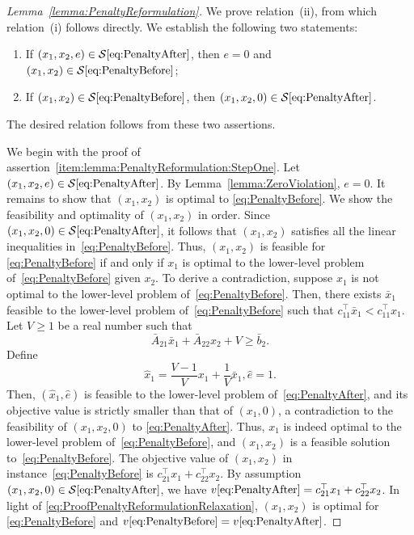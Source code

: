 \documentclass[runningheads,orivec]{llncs}
\newcommand{\MacroColor}[1]{#1}
\newcommand{\OptValFunc}{\MacroColor{v}}
\newcommand{\OptSolSet}{\MacroColor{\mathcal{S}}}
\newcommand{\ReformPen}{\MacroColor{e}}
\begin{document}
\begin{appendix}
\begin{proof}[Lemma~\ref{lemma:PenaltyReformulation}]
We prove relation~(ii), from which relation~(i) follows directly.
We establish the following two statements: 
\begin{enumerate}[label=(A-\arabic*)]
\item
\label{item:lemma:PenaltyReformulation:StepOne}
If $(x_1, x_2, \ReformPen) \in \OptSolSet\eqref{eq:PenaltyAfter}$, then $\ReformPen = 0$ and $(x_1, x_2) \in \OptSolSet\eqref{eq:PenaltyBefore}$;
\item 
\label{item:lemma:PenaltyReformulation:StepTwo}
If $(x_1, x_2) \in \OptSolSet\eqref{eq:PenaltyBefore}$, then $(x_1, x_2, 0) \in \OptSolSet\eqref{eq:PenaltyAfter}$.
\end{enumerate}
The desired relation follows from these two assertions.

We begin with the proof of assertion~\ref{item:lemma:PenaltyReformulation:StepOne}.
Let $(x_1, x_2, \ReformPen) \in \OptSolSet\eqref{eq:PenaltyAfter}$.
By Lemma~\ref{lemma:ZeroViolation}, $\ReformPen = 0$.
It remains to show that $(x_1, x_2)$ is optimal to \eqref{eq:PenaltyBefore}. 
We show the feasibility and optimality of $(x_1, x_2)$ in order.
Since $(x_1, x_2, 0) \in \OptSolSet\eqref{eq:PenaltyAfter}$, it follows that $(x_1, x_2)$ satisfies all the linear inequalities in~\eqref{eq:PenaltyBefore}.
Thus, $(x_1, x_2)$ is feasible for \eqref{eq:PenaltyBefore} if and only if $x_1$ is optimal to the lower-level problem of~\eqref{eq:PenaltyBefore} given $x_2$.
To derive a contradiction, suppose $x_1$ is not optimal to the lower-level problem of~\eqref{eq:PenaltyBefore}.
Then, there exists $\bar{x}_1$ feasible to the lower-level problem of~\eqref{eq:PenaltyBefore} such that $c_{1 1}^{\top} \bar{x}_1 < c_{1 1}^{\top} x_1$.
Let $V \ge 1$ be a real number such that
$$
\bar{A}_{2 1} \bar{x}_1 + \bar{A}_{2 2} x_2 + V \ge \bar{b}_2.
$$
Define
$$
\hat{x}_1 = \frac{V - 1}{V} x_1 + \frac{1}{V} \bar{x}_1, \hat{e} = 1.
$$
Then, $(\hat{x}_1, \hat{e})$ is feasible to the lower-level problem of~\eqref{eq:PenaltyAfter}, and its objective value is strictly smaller than that of $(x_1, 0)$, a contradiction to the feasibility of $(x_1, x_2, 0)$ to \eqref{eq:PenaltyAfter}.
Thus, $x_1$ is indeed optimal to the lower-level problem of~\eqref{eq:PenaltyBefore}, and $(x_1, x_2)$ is a feasible solution to~\eqref{eq:PenaltyBefore}.
The objective value of $(x_1, x_2)$ in instance~\eqref{eq:PenaltyBefore} is $c_{21}^{\top} x_1 + c_{22}^{\top} x_2$.
By assumption $(x_1, x_2, 0) \in \OptSolSet\eqref{eq:PenaltyAfter}$, we have $\OptValFunc\eqref{eq:PenaltyAfter} = c_{21}^{\top} x_1 + c_{22}^{\top} x_2$.
In light of \eqref{eq:ProofPenaltyReformulationRelaxation}, $(x_1, x_2)$ is optimal for \eqref{eq:PenaltyBefore} and $\OptValFunc\eqref{eq:PenaltyBefore} = \OptValFunc\eqref{eq:PenaltyAfter}$.


\end{proof}
\end{appendix}
\end{document}
